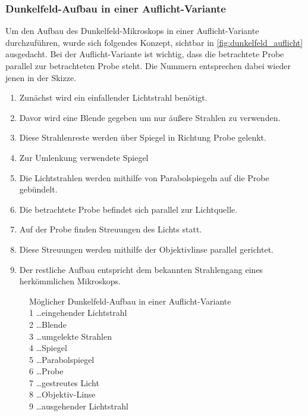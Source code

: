\documentclass[12pt,english,ngerman]{scrartcl}
\begin{document}
\subsubsection{Dunkelfeld-Aufbau in einer Auflicht-Variante}

Um den Aufbau des Dunkelfeld-Mikroskops in einer Auflicht-Variante
durchzuführen, wurde sich folgendes Konzept, sichtbar in
\autoref{fig:dunkelfeld_auflicht} ausgedacht. Bei der Auflicht-Variante ist
wichtig, dass die betrachtete Probe parallel zur betrachteten Probe steht. Die
Nummern entsprechen dabei wieder jenen in der Skizze.

\begin{enumerate}
	\item Zunächst wird ein einfallender Lichtstrahl benötigt.
	\item Davor wird eine Blende gegeben um nur äußere Strahlen zu verwenden.
	\item Diese Strahlenreste werden über Spiegel in Richtung Probe gelenkt.
	\item Zur Umlenkung verwendete Spiegel
	\item Die Lichtstrahlen werden mithilfe von Parabolspiegeln auf die Probe gebündelt.
	\item Die betrachtete Probe befindet sich parallel zur Lichtquelle.
	\item Auf der Probe finden Streuungen des Lichts statt.
	\item Diese Streuungen werden mithilfe der Objektivlinse parallel gerichtet.
	\item Der restliche Aufbau entspricht dem bekannten Strahlengang eines herkömmlichen
	      Mikroskops.
\end{enumerate}

\begin{figure}[H]
	\begin{center}
	\end{center}
	\caption[Möglicher Dunkelfeld-Aufbau in einer Auflicht-Variante] { Möglicher
		Dunkelfeld-Aufbau in einer Auflicht-Variante \\
		1 \dots eingehender Lichtstrahl              \\
		2 \dots Blende                               \\
		3 \dots umgelekte Strahlen                   \\
		4 \dots Spiegel                              \\
		5 \dots Parabolspiegel                       \\
		6 \dots Probe                                \\
		7 \dots gestreutes Licht                     \\
		8 \dots Objektiv-Linse                       \\
		9 \dots ausgehender Lichtstrahl
	}\label{fig:dunkelfeld_auflicht}
\end{figure}
\end{document}
